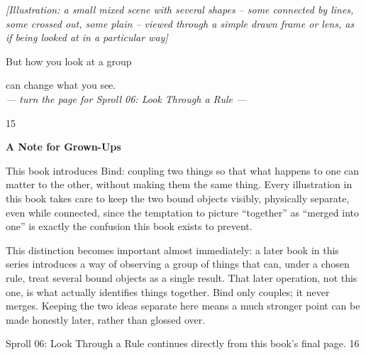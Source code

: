 \documentclass[12pt]{book}
\newcommand{\artnote}[1]{{\color{gray!70}\small\itshape [Illustration: #1]}\par\vspace{0.3in}}
\newcommand{\bigline}[1]{{\Huge #1}\par}
\newcommand{\pagenum}[1]{\vfill{\color{gray!50}\footnotesize #1}}
\newcommand{\sprollpage}{\newpage\vspace*{0.4in}}
\begin{document}
\sprollpage
\begin{center}
\vspace*{0.5in}
\artnote{a small mixed scene with several shapes -- some connected by lines, some crossed out, some plain -- viewed through a simple drawn frame or lens, as if being looked at in a particular way}
\vspace{0.3in}
\bigline{But how you look at a group}\vspace{0.1in}
{\Large can change what you see.}
\vspace{0.35in}\\
{\small \textit{--- turn the page for Sproll 06: Look Through a Rule ---}}
\end{center}
\pagenum{15}

\sprollpage
\vspace*{0.3in}
{\large \textbf{A Note for Grown-Ups}}
\vspace{0.2in}

\normalsize
This book introduces Bind: coupling two things so that what happens to one can matter to the other, without making them the same thing. Every illustration in this book takes care to keep the two bound objects visibly, physically separate, even while connected, since the temptation to picture ``together'' as ``merged into one'' is exactly the confusion this book exists to prevent.

\vspace{0.15in}
This distinction becomes important almost immediately: a later book in this series introduces a way of observing a group of things that can, under a chosen rule, treat several bound objects as a single result. That later operation, not this one, is what actually identifies things together. Bind only couples; it never merges. Keeping the two ideas separate here means a much stronger point can be made honestly later, rather than glossed over.

\vspace{0.3in}
{\small Sproll 06: Look Through a Rule continues directly from this book's final page.}
\pagenum{16}
\end{document}

